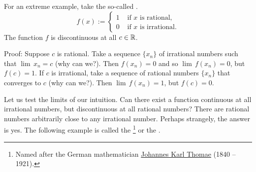 \begin{example}
For an extreme example, take the so-called
\emph{}.
\begin{equation*}
f(x) :=
\begin{cases}
1 & \text{ if $x$ is rational,} \\
0 & \text{ if $x$ is irrational.}
\end{cases}
\end{equation*}
The function $f$ is discontinuous at all $c \in {\mathbb{R}}$.

Proof:
Suppose $c$ is rational.  Take a sequence $\{ x_n \}$
of irrational numbers such that $\lim\, x_n = c$ (why can we?).  Then $f(x_n) = 0$
and so $\lim\, f(x_n) = 0$, but $f(c) = 1$.
If $c$ is irrational, take a sequence of rational numbers $\{ x_n \}$
that converges to $c$ (why can we?).  Then $\lim\, f(x_n) = 1$, but $f(c) = 0$.
\end{example}

Let us test the limits of our intuition.  Can
there exist a function continuous at all irrational numbers, but
discontinuous at all rational numbers?  There are rational numbers
arbitrarily close to any irrational number.  Perhaps strangely, the
answer is yes.  The following example is called the
\emph{}\footnote{Named after the German
mathematician
\href{http://en.wikipedia.org/wiki/Thomae}{Johannes Karl Thomae}
(1840 -- 1921).} or the
\emph{}.

